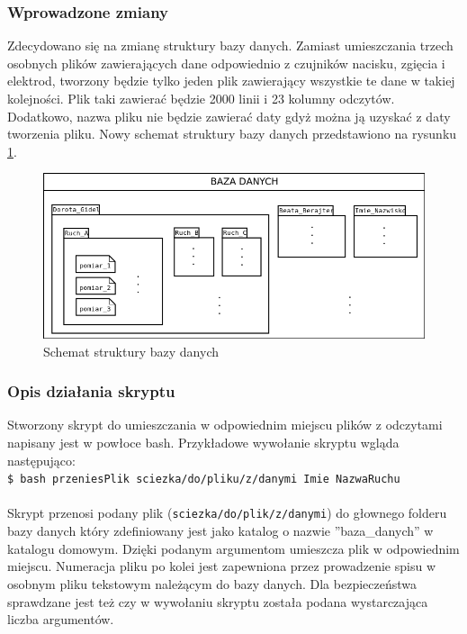 ﻿\documentclass{article}
\begin{document}
\subsubsection{Wprowadzone zmiany}
Zdecydowano się na zmianę struktury bazy danych. Zamiast umieszczania trzech osobnych plików zawierających dane odpowiednio z czujników nacisku, zgięcia i elektrod, tworzony będzie tylko jeden plik zawierający wszystkie te dane w takiej kolejności. Plik taki zawierać będzie 2000 linii i 23 kolumny odczytów. Dodatkowo, nazwa pliku nie będzie zawierać daty gdyż można ją uzyskać z daty tworzenia pliku. Nowy schemat struktury bazy danych przedstawiono na rysunku \ref{rys:baza_danych}.
\begin{figure}[H]
    \centering
    \includegraphics[width=\textwidth]{baza_danych.png}
    \caption{Schemat struktury bazy danych}
    \label{rys:baza_danych}
\end{figure}

\subsubsection{Opis działania skryptu}
Stworzony skrypt do umieszczania w odpowiednim miejscu plików z odczytami napisany jest w powłoce bash. Przykładowe wywołanie skryptu wgląda następująco:\\

\texttt{\$ bash przeniesPlik sciezka/do/pliku/z/danymi Imie NazwaRuchu}\\ \\
Skrypt przenosi podany plik (\texttt{sciezka/do/plik/z/danymi}) do głownego folderu bazy danych który zdefiniowany jest jako katalog o nazwie ''baza\_danych'' w katalogu domowym. Dzięki podanym argumentom umieszcza plik w odpowiednim miejscu. Numeracja pliku po kolei jest zapewniona przez prowadzenie spisu w osobnym pliku tekstowym należącym do bazy danych. Dla bezpieczeństwa sprawdzane jest też czy w wywołaniu skryptu została podana wystarczająca liczba argumentów.
\end{document}
